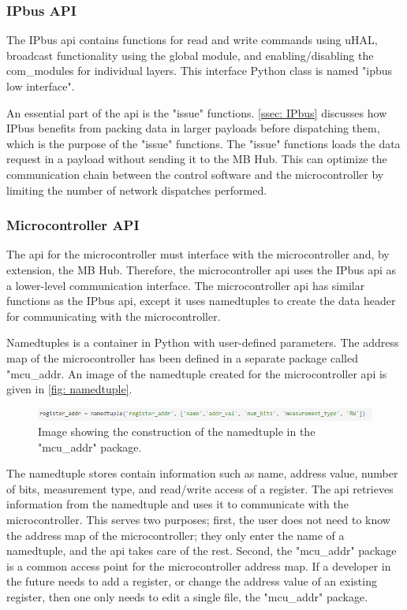 \documentclass[main.tex]{subfiles}
\begin{document}
\subsubsection{IPbus API}
The IPbus \gls{api} contains functions for read and write commands using uHAL, broadcast functionality using the global module, and enabling/disabling the com\_modules for individual layers. This interface Python class is named "ipbus low interface".

An essential part of the \gls{api} is the "issue" functions. \autoref{ssec: IPbus} discusses how IPbus benefits from packing data in larger payloads before dispatching them, which is the purpose of the "issue" functions. The "issue" functions loads the data request in a payload without sending it to the MB Hub. This can optimize the communication chain between the control software and the microcontroller by limiting the number of network dispatches performed.

\subsubsection{Microcontroller API}

The \gls{api} for the microcontroller must interface with the microcontroller and, by extension, the MB Hub. Therefore, the microcontroller \gls{api} uses the IPbus \gls{api} as a lower-level communication interface. The microcontroller \gls{api} has similar functions as the IPbus \gls{api}, except it uses namedtuples to create the data header for communicating with the microcontroller.

Namedtuples is a container in Python with user-defined parameters. The address map of the microcontroller has been defined in a separate package called "mcu\_addr. An image of the namedtuple created for the microcontroller \gls{api} is given in \autoref{fig: namedtuple}.


\begin{figure}[!ht]
    \centering
    \includegraphics[width=15cm, scale=4]{images/namedtuple.png}
    \caption{Image showing the construction of the namedtuple in the "mcu\_addr" package.}
    \label{fig: namedtuple}
\end{figure}
\FloatBarrier

The namedtuple stores contain information such as name, address value, number of bits, measurement type, and read/write access of a register. The \gls{api} retrieves information from the namedtuple and uses it to communicate with the microcontroller. This serves two purposes; first, the user does not need to know the address map of the microcontroller; they only enter the name of a namedtuple, and the \gls{api} takes care of the rest. Second, the "mcu\_addr" package is a common access point for the microcontroller address map. If a developer in the future needs to add a register, or change the address value of an existing register, then one only needs to edit a single file, the "mcu\_addr" package.
\end{document}
